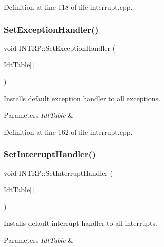 Definition at line 118 of file interrupt.\+cpp.

\mbox{\label{namespace_i_n_t_r_p_a4a1a1ff73a4e9bb1c17daf205170daa9}} 
\subsubsection{\texorpdfstring{Set\+Exception\+Handler()}{SetExceptionHandler()}}
{\footnotesize\ttfamily void I\+N\+T\+R\+P\+::\+Set\+Exception\+Handler (\begin{DoxyParamCaption}\item[{\hyperlink{union_i_n_t_r_p_1_1_descriptor_entry}{Descriptor\+Entry}}]{Idt\+Table\mbox{[}$\,$\mbox{]} }\end{DoxyParamCaption})}



Installs default exception handler to all exceptions. 


\begin{DoxyParams}{Parameters}
{\em Idt\+Table} & \\
\hline
\end{DoxyParams}


Definition at line 162 of file interrupt.\+cpp.

\mbox{\label{namespace_i_n_t_r_p_abf09ee877603981fe255cd050cbbb110}} 
\subsubsection{\texorpdfstring{Set\+Interrupt\+Handler()}{SetInterruptHandler()}}
{\footnotesize\ttfamily void I\+N\+T\+R\+P\+::\+Set\+Interrupt\+Handler (\begin{DoxyParamCaption}\item[{\hyperlink{union_i_n_t_r_p_1_1_descriptor_entry}{Descriptor\+Entry}}]{Idt\+Table\mbox{[}$\,$\mbox{]} }\end{DoxyParamCaption})}



Installs default interrupt handler to all interrupts. 


\begin{DoxyParams}{Parameters}
{\em Idt\+Table} & \\
\hline
\end{DoxyParams}


